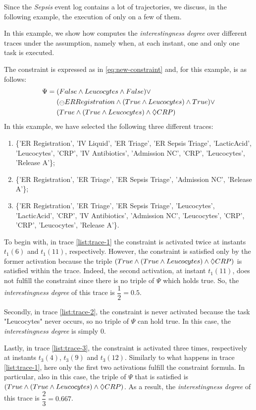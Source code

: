 Since the \textit{Sepsis} event log contains a lot of trajectories, we discuss, in the following example, the execution of \janus only on a few of them.
\begin{example}\label{ex:sepsis-result}
In this example, we show how \janus computes the \textit{interestingness degree} over different traces under the \declare assumption, namely when, at each instant, one and only one task is executed.

The constraint is expressed as in \ref{eq:new-constraint} and, for this example, is as follows:
\begin{align*}
\Psi = \;& (False \lAND Leucocytes \lAND False) \lOR\\
& (\Yesterday ER Registration \lAND (True \lAND Leucocytes) \lAND True) \lOR\\
& (True \lAND (True \lAND Leucocytes) \lAND \Diamond CRP)
\end{align*}
In this example, we have selected the following three different traces:
\begin{enumerate}
\item \label{list:trace-1} \{'ER Registration', 'IV Liquid', 'ER Triage', 'ER Sepsis Triage', 'LacticAcid', 'Leucocytes', 'CRP', 'IV Antibiotics', 'Admission NC', 'CRP', 'Leucocytes', 'Release A'\};
\item \label{list:trace-2} \{'ER Registration', 'ER Triage', 'ER Sepsis Triage', 'Admission NC', 'Release A'\};
\item \label{list:trace-3} \{'ER Registration', 'ER Triage', 'ER Sepsis Triage', 'Leucocytes', 'LacticAcid', 'CRP', 'IV Antibiotics', 'Admission NC', 'Leucocytes', 'CRP', 'CRP', 'Leucocytes', 'Release A'\}.
\end{enumerate}
To begin with, in trace \ref{list:trace-1} the constraint is activated twice at instants $t_1(6)$ and $t_1(11)$, respectively. However, the constraint is satisfied only by the former activation because the triple $(True \wedge (True \wedge Leucocytes) \wedge \Diamond CRP)$ is satisfied within the trace. Indeed, the second activation, at instant $t_1(11)$, does not fulfill the constraint since there is no triple of $\Psi$ which holds true. So, the \textit{interestingness degree} of this trace is $\dfrac{1}{2} = 0.5$.

Secondly, in trace \ref{list:trace-2}, the constraint is never activated because the task "Leucocytes" never occurs, so no triple of $\Psi$ can hold true. In this case, the \textit{interestingness degree} is simply $0$.

Lastly, in trace \ref{list:trace-3}, the constraint is activated three times, respectively at instants $t_3(4)$,  $t_3(9)$ and $t_3(12)$. Similarly to what happens in trace \ref{list:trace-1}, here only the first two activations fulfill the constraint formula. In particular, also in this case, the triple of $\Psi$ that is satisfied is $(True \wedge (True \wedge Leucocytes) \wedge \Diamond CRP)$. As a result, the \textit{interestingness degree} of this trace is $\dfrac{2}{3} = 0.667$.
\end{example}

